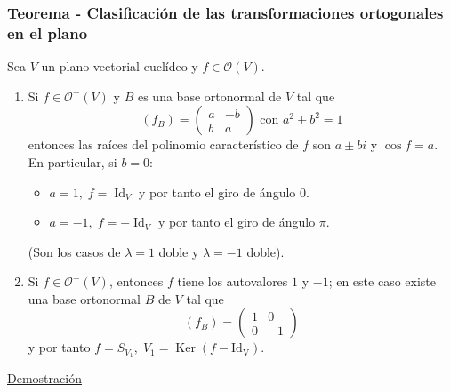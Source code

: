 \documentclass[12pt, a4paper, ones, notitlepage, openany,titlepage]{article}
\newcommand{\demostracion}{\noindent\underline{Demostración}}
\begin{document}
\subsubsection{Teorema - Clasificación de las transformaciones ortogonales en el plano}
\noindent Sea $V$ un plano vectorial euclídeo y $f \in \mathcal{O}(V)$. 
\begin{enumerate}[label=(\arabic*)]
	\item Si $f \in \mathcal{O}^+(V)$ y $B$ es una base ortonormal de $V$ tal que
	$$
	(f_B) =
	\begin{pmatrix}
		a & -b \\
		b & a
	\end{pmatrix}
	\text{ con } a^2 + b^2 = 1
	$$
	entonces las raíces del polinomio característico de $f$ son $a \pm bi$ y $\operatorname{cos}f = a$. En particular, si $b = 0$:
	\begin{itemize}
		\item $a = 1, \; f = \operatorname{Id}_V$ y por tanto el giro de ángulo $0$.
		\item $a = -1, \; f = -\operatorname{Id}_V$ y por tanto el giro de ángulo $\pi$.
	\end{itemize}
	(Son los casos de $\lambda = 1$ doble y $\lambda = -1$ doble).
	
	\item Si $f \in \mathcal{O}^-(V)$, entonces $f$ tiene los autovalores $1$ y $-1$; en este caso existe una base ortonormal $B$ de $V$ tal que
	$$
	(f_B) = \begin{pmatrix}
		1 & 0 \\
		0 & -1
	\end{pmatrix}
	$$
	y por tanto $f = S_{V_1}, \; V_1 = \operatorname{Ker}(f - \operatorname{Id_V})$.
\end{enumerate}
\demostracion
\end{document}
